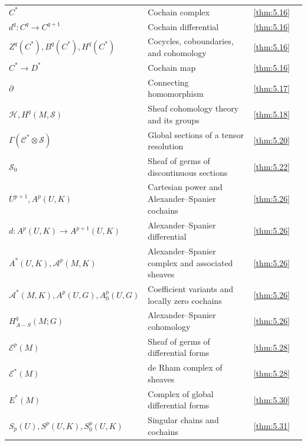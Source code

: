 {\begin{longtable}{@{}>{\raggedright\arraybackslash}p{.39\linewidth}>{\raggedright\arraybackslash}p{.39\linewidth}r r@{}}
$C^{*}$ & Cochain complex & \ref{thm:5.16} & \pageref{thm:5.16} \\
$d^{q}\colon C^{q}\to C^{q+1}$ & Cochain differential & \ref{thm:5.16} & \pageref{thm:5.16} \\
$Z^{q}(C^{*}),\allowbreak B^{q}(C^{*}),\allowbreak H^{q}(C^{*})$ & Cocycles, coboundaries, and cohomology & \ref{thm:5.16} & \pageref{thm:5.16} \\
$C^{\ast}\to D^{\ast}$ & Cochain map & \ref{thm:5.16} & \pageref{thm:5.16} \\
$\partial$ & Connecting homomorphism & \ref{thm:5.17} & \pageref{thm:5.17} \\
$\mathcal{H},\allowbreak H^{q}(M,\allowbreak \mathcal{S})$ & Sheaf cohomology theory and its groups & \ref{thm:5.18} & \pageref{thm:5.18} \\
$\Gamma(\mathcal{C}^{\ast}\otimes\mathcal{S})$ & Global sections of a tensor resolution & \ref{thm:5.20} & \pageref{thm:5.20} \\
$\mathcal S_0$ & Sheaf of germs of discontinuous sections & \ref{thm:5.22} & \pageref{thm:5.22} \\
$U^{p+1},\allowbreak A^{p}(U,\allowbreak K)$ & Cartesian power and Alexander--Spanier cochains & \ref{thm:5.26} & \pageref{thm:5.26} \\
$d:A^{p}(U,\allowbreak K)\to A^{p+1}(U,\allowbreak K)$ & Alexander--Spanier differential & \ref{thm:5.26} & \pageref{thm:5.26} \\
$A^{*}(U,\allowbreak K),\allowbreak \mathcal{A}^{p}(M,\allowbreak K)$ & Alexander--Spanier complex and associated sheaves & \ref{thm:5.26} & \pageref{thm:5.26} \\
$\mathcal{A}^{*}(M,\allowbreak K),\allowbreak A^{p}(U,\allowbreak G),\allowbreak A_{0}^{p}(U,\allowbreak G)$ & Coefficient variants and locally zero cochains & \ref{thm:5.26} & \pageref{thm:5.26} \\
$H_{A-S}^{q}(M;G)$ & Alexander--Spanier cohomology & \ref{thm:5.26} & \pageref{thm:5.26} \\
$\mathcal{E}^{p}(M)$ & Sheaf of germs of differential forms & \ref{thm:5.28} & \pageref{thm:5.28} \\
$\mathcal{E}^{*}(M)$ & de Rham complex of sheaves & \ref{thm:5.28} & \pageref{thm:5.28} \\
$E^{*}(M)$ & Complex of global differential forms & \ref{thm:5.30} & \pageref{thm:5.30} \\
$S_{p}(U),\allowbreak S^{p}(U,\allowbreak K),\allowbreak S_{0}^{p}(U,\allowbreak K)$ & Singular chains and cochains & \ref{thm:5.31} & \pageref{thm:5.31} \\

\end{longtable}}
